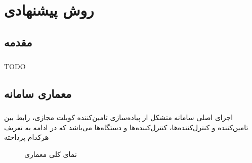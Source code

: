 
\chapter{روش پیشنهادی} \label{ch:method}
\thispagestyle{empty}

\section{مقدمه}
\paragraph{}{
    TODO
}

\section{معماری سامانه}
\paragraph{}{
    اجزای اصلی سامانه متشکل از پیاده‌سازی تامین‌کننده کوبلت مجازی، رابط بین تامین‌کننده و کنترل‌کننده‌ها، کنترل‌کننده‌ها و دستگاه‌ها می‌باشد که در ادامه به تعریف هرکدام پرداخته
    \begin{figure}[H]
        \caption{نمای کلی معماری}
        \label{fig:arch}
    \end{figure}
}

